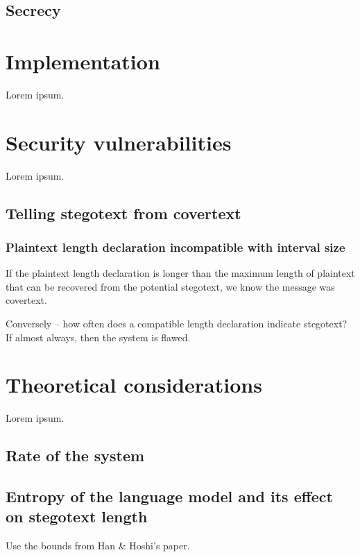 \documentclass[draft]{IIBproject}
\begin{document}
\subsection{Secrecy}

\newpage
\section{Implementation}

Lorem ipsum.

\newpage
\section{Security vulnerabilities}

Lorem ipsum.

\subsection{Telling stegotext from covertext}

\subsubsection{Plaintext length declaration incompatible with interval size}

If the plaintext length declaration is longer than the maximum length of plaintext that can be recovered from the potential stegotext, we know the message was covertext.

Conversely -- how often does a compatible length declaration indicate stegotext? If almost always, then the system is flawed.

\newpage
\section{Theoretical considerations}

Lorem ipsum.

\subsection{Rate of the system}

\subsection{Entropy of the language model and its effect on stegotext length}

Use the bounds from Han \& Hoshi's paper.
\end{document}
